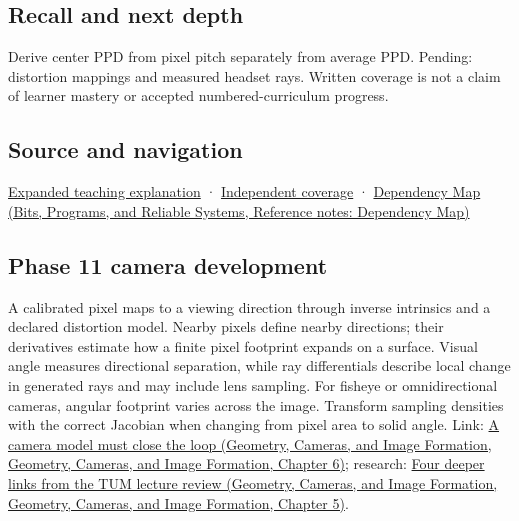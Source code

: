 \subsection{Recall and next depth}\label{appendix-7d356c396d1a-recall-and-next-depth}

Derive center PPD from pixel pitch separately from average PPD. Pending: distortion mappings and measured headset rays. Written coverage is not a claim of learner mastery or accepted numbered-curriculum progress.

\subsection{Source and navigation}\label{appendix-7d356c396d1a-source-and-navigation}

\hyperref[04-visual-computing-ii-ch042-angles-connect-display-samples-to-a-viewer]{Expanded teaching explanation} · \hyperref[appendix-fd090d982a15-xr01---independent-seeing-and-representation-source]{Independent coverage} · \href{../01-Bits-Programs-and-Reliable-Systems/main.pdf\#nameddest=appendix-4ad47bdd269a}{Dependency Map (Bits, Programs, and Reliable Systems, Reference notes: Dependency Map)}

\subsection{Phase 11 camera development}\label{appendix-7d356c396d1a-phase-11-camera-development}

A calibrated pixel maps to a viewing direction through inverse intrinsics and a declared distortion model. Nearby pixels define nearby directions; their derivatives estimate how a finite pixel footprint expands on a surface. Visual angle measures directional separation, while ray differentials describe local change in generated rays and may include lens sampling. For fisheye or omnidirectional cameras, angular footprint varies across the image. Transform sampling densities with the correct Jacobian when changing from pixel area to solid angle. Link: \href{../03-Geometry-Cameras-and-Image-Formation/main.pdf\#nameddest=02-foundations-ii-ch037-a-camera-model-must-close-the-loop}{A camera model must close the loop (Geometry, Cameras, and Image Formation, Geometry, Cameras, and Image Formation, Chapter 6)}; research: \href{../03-Geometry-Cameras-and-Image-Formation/main.pdf\#nameddest=02-foundations-ii-ch036-four-deeper-links-from-the-tum-lecture-review}{Four deeper links from the TUM lecture review (Geometry, Cameras, and Image Formation, Geometry, Cameras, and Image Formation, Chapter 5)}.
